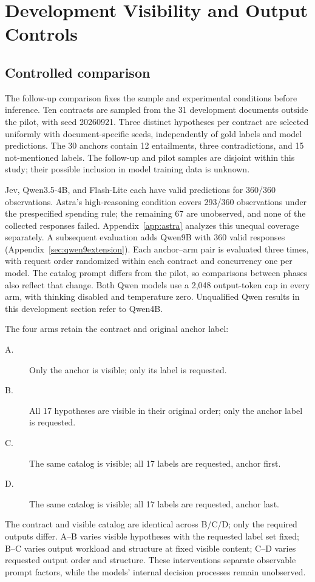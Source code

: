 \section{Development Visibility and Output Controls}
\label{sec:planned}
\subsection{Controlled comparison}
The follow-up comparison fixes the sample and experimental conditions before inference. Ten contracts are sampled from the 31 development documents outside the pilot, with seed 20260921. Three distinct hypotheses per contract are selected uniformly with document-specific seeds, independently of gold labels and model predictions. The 30 anchors contain 12 entailments, three contradictions, and 15 not-mentioned labels. The follow-up and pilot samples are disjoint within this study; their possible inclusion in model training data is unknown.

Jev, Qwen3.5-4B, and Flash-Lite each have valid predictions for 360/360 observations. Astra's high-reasoning condition covers 293/360 observations under the prespecified spending rule; the remaining 67 are unobserved, and none of the collected responses failed. Appendix~\ref{app:astra} analyzes this unequal coverage separately. A subsequent evaluation adds Qwen9B with 360 valid responses (Appendix~\ref{sec:qwen9extension}). Each anchor--arm pair is evaluated three times, with request order randomized within each contract and concurrency one per model. The catalog prompt differs from the pilot, so comparisons between phases also reflect that change. Both Qwen models use a 2,048 output-token cap in every arm, with thinking disabled and temperature zero. Unqualified Qwen results in this development section refer to Qwen4B.

The four arms retain the contract and original anchor label:
\begin{description}
\item[A.] Only the anchor is visible; only its label is requested.
\item[B.] All 17 hypotheses are visible in their original order; only the anchor label is requested.
\item[C.] The same catalog is visible; all 17 labels are requested, anchor first.
\item[D.] The same catalog is visible; all 17 labels are requested, anchor last.
\end{description}
The contract and visible catalog are identical across B/C/D; only the required outputs differ. A--B varies visible hypotheses with the requested label set fixed; B--C varies output workload and structure at fixed visible content; C--D varies requested output order and structure. These interventions separate observable prompt factors, while the models' internal decision processes remain unobserved.

